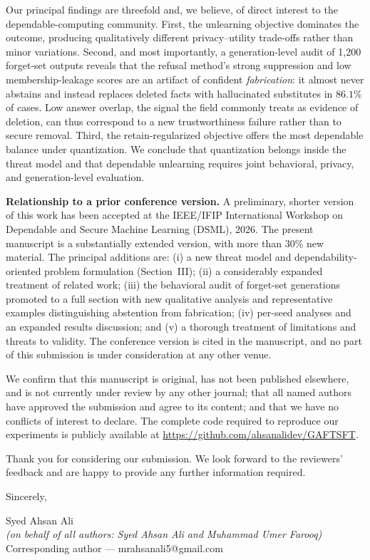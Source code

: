 \documentclass[11pt]{article}
\begin{document}
Our principal findings are threefold and, we believe, of direct interest to the dependable-computing community. First, the unlearning objective dominates the outcome, producing qualitatively different privacy--utility trade-offs rather than minor variations. Second, and most importantly, a generation-level audit of 1{,}200 forget-set outputs reveals that the refusal method's strong suppression and low membership-leakage scores are an artifact of confident \emph{fabrication}: it almost never abstains and instead replaces deleted facts with hallucinated substitutes in $86.1\%$ of cases. Low answer overlap, the signal the field commonly treats as evidence of deletion, can thus correspond to a new trustworthiness failure rather than to secure removal. Third, the retain-regularized objective offers the most dependable balance under quantization. We conclude that quantization belongs inside the threat model and that dependable unlearning requires joint behavioral, privacy, and generation-level evaluation.

\textbf{Relationship to a prior conference version.} A preliminary, shorter version of this work has been accepted at the IEEE/IFIP International Workshop on Dependable and Secure Machine Learning (DSML), 2026. The present manuscript is a substantially extended version, with more than 30\% new material. The principal additions are: (i) a new threat model and dependability-oriented problem formulation (Section~III); (ii) a considerably expanded treatment of related work; (iii) the behavioral audit of forget-set generations promoted to a full section with new qualitative analysis and representative examples distinguishing abstention from fabrication; (iv) per-seed analyses and an expanded results discussion; and (v) a thorough treatment of limitations and threats to validity. The conference version is cited in the manuscript, and no part of this submission is under consideration at any other venue.

We confirm that this manuscript is original, has not been published elsewhere, and is not currently under review by any other journal; that all named authors have approved the submission and agree to its content; and that we have no conflicts of interest to declare. The complete code required to reproduce our experiments is publicly available at \url{https://github.com/ahsanalidev/GAFTSFT}.

Thank you for considering our submission. We look forward to the reviewers' feedback and are happy to provide any further information required.

\vspace{1.2em}
Sincerely,

\vspace{1.6em}
Syed Ahsan Ali \\
\emph{(on behalf of all authors: Syed Ahsan Ali and Muhammad Umer Farooq)} \\
Corresponding author --- mrahsanali5@gmail.com
\end{document}
